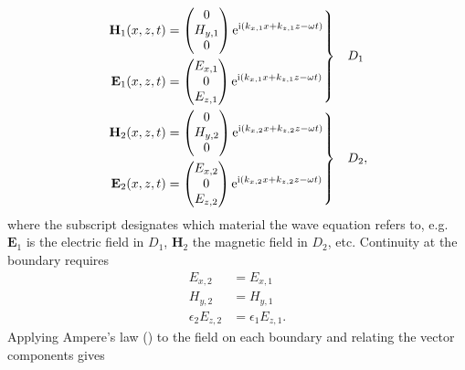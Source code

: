 \begin{align}
\left.\begin{aligned}
\mathbf{H}_1(x,z,t) &=
\begin{pmatrix}
0\\
H_{y,1}\\
0
\end{pmatrix} {\mathrm{e}}^{{\mathrm{i}}(k_{x,1}x+k_{z,1}z-\omega t)}\\
\mathbf{E}_1(x,z,t) &=
\begin{pmatrix}
E_{x,1}\\
0\\
E_{z,1}\\
\end{pmatrix} {\mathrm{e}}^{{\mathrm{i}}(k_{x,1}x+k_{z,1}z-\omega t)}
\end{aligned}
\right\}& \quad D_1\label{eqn:planewavedielectric}\\
\left.\begin{aligned}
\mathbf{H}_2(x,z,t) &=
\begin{pmatrix}
0\\
H_{y,2}\\
0
\end{pmatrix}
{\mathrm{e}}^{{\mathrm{i}}(k_{x,2}x+k_{z,2}z-\omega t)}\\
\mathbf{E}_2(x,z,t) &=
\begin{pmatrix}
E_{x,2}\\
0\\
E_{z,2}\\
\end{pmatrix}
{\mathrm{e}}^{{\mathrm{i}}(k_{x,2}x+k_{z,2}z-\omega t)}
\end{aligned} 
\right\}&\quad D_2,
\label{eqn:planewavemetal}
\end{align}
where the subscript designates which material the wave equation refers to,
e.g.\ $\mathbf{E}_1$ is the electric field in $D_1$, $\mathbf{H}_2$
the magnetic field in $D_2$, etc. Continuity at the boundary 
requires
\begin{align}
E_{x,2}&=E_{x,1}\\
H_{y,2}&=H_{y,1}\\
\epsilon_2 E_{z,2}&=\epsilon_1 E_{z,1}.
\end{align}
Applying Ampere's law () to the field on 
each boundary and relating the vector components gives
